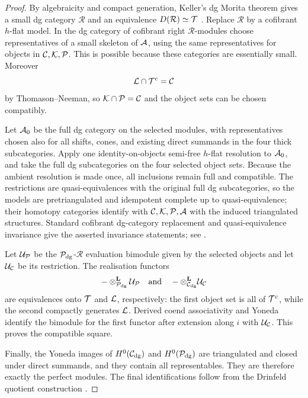\begin{proof}
By algebraicity and compact generation, Keller's dg Morita theorem gives a small dg category \(\mathcal R\) and an equivalence \(D(\mathcal R)\simeq\mathcal T\) \cite{Keller94}.  Replace \(\mathcal R\) by a cofibrant \(h\)-flat model.  In the dg category of cofibrant right \(\mathcal R\)-modules choose representatives of a small skeleton of \(\mathcal A\), using the same representatives for objects in \(\mathcal C,\mathcal K,\mathcal P\).  This is possible because these categories are essentially small.  Moreover
\[
 \mathcal L\cap\mathcal T^c=\mathcal C
\]
by Thomason--Neeman, so \(\mathcal K\cap\mathcal P=\mathcal C\) and the object sets can be chosen compatibly.

Let \(\mathcal A_0\) be the full dg category on the selected modules, with representatives chosen also for all shifts, cones, and existing direct summands in the four thick subcategories.  Apply one identity-on-objects semi-free \(h\)-flat resolution to \(\mathcal A_0\), and take the full dg subcategories on the four selected object sets.  Because the ambient resolution is made once, all inclusions remain full and compatible.  The restrictions are quasi-equivalences with the original full dg subcategories, so the models are pretriangulated and idempotent complete up to quasi-equivalence; their homotopy categories identify with \(\mathcal C,\mathcal K,\mathcal P,\mathcal A\) with the induced triangulated structures.  Standard cofibrant dg-category replacement and quasi-equivalence invariance give the asserted invariance statements; see \cite{Tabuada05,Keller94}.

Let \(\mathcal U_{\mathcal P}\) be the \(\mathcal P_{\mathrm{dg}}\)-\(\mathcal R\) evaluation bimodule given by the selected objects and let \(\mathcal U_{\mathcal C}\) be its restriction.  The realisation functors
\[
 -\otimes^{\mathbf L}_{\mathcal P_{\mathrm{dg}}}\mathcal U_{\mathcal P}
 \quad\text{and}\quad
 -\otimes^{\mathbf L}_{\mathcal C_{\mathrm{dg}}}\mathcal U_{\mathcal C}
\]
are equivalences onto \(\mathcal T\) and \(\mathcal L\), respectively: the first object set is all of \(\mathcal T^c\), while the second compactly generates \(\mathcal L\).  Derived coend associativity and Yoneda identify the bimodule for the first functor after extension along \(i\) with \(\mathcal U_{\mathcal C}\).  This proves the compatible square.

Finally, the Yoneda images of \(H^0(\mathcal C_{\mathrm{dg}})\) and \(H^0(\mathcal P_{\mathrm{dg}})\) are triangulated and closed under direct summands, and they contain all representables.  They are therefore exactly the perfect modules.  The final identifications follow from the Drinfeld quotient construction \cite{Drinfeld04}.
\end{proof}

